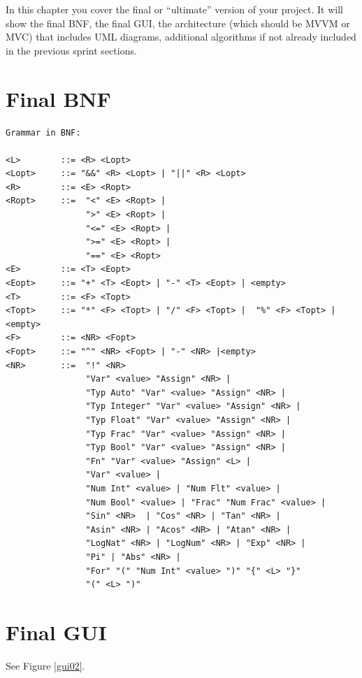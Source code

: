 \documentclass[a4paper, oneside, 11pt]{report}
\begin{document}
In this chapter you cover the final or ``ultimate'' version of your project. It will show the final BNF, the final GUI, the architecture (which should be MVVM or MVC) that includes UML diagrams, additional algorithms if not already included in the previous sprint sections.

\section{Final BNF}
\begin{verbatim}
Grammar in BNF:

<L>        ::= <R> <Lopt>
<Lopt>     ::= "&&" <R> <Lopt> | "||" <R> <Lopt> 
<R>        ::= <E> <Ropt>
<Ropt>     ::=  "<" <E> <Ropt> | 
                ">" <E> <Ropt> |  
                "<=" <E> <Ropt> | 
                ">=" <E> <Ropt> |
                "==" <E> <Ropt>
<E>        ::= <T> <Eopt>
<Eopt>     ::= "+" <T> <Eopt> | "-" <T> <Eopt> | <empty>
<T>        ::= <F> <Topt>
<Topt>     ::= "*" <F> <Topt> | "/" <F> <Topt> |  "%" <F> <Topt> |<empty>
<F>        ::= <NR> <Fopt>
<Fopt>     ::= "^" <NR> <Fopt> | "-" <NR> |<empty> 
<NR>       ::=  "!" <NR>
                "Var" <value> "Assign" <NR> |
                "Typ Auto" "Var" <value> "Assign" <NR> |
                "Typ Integer" "Var" <value> "Assign" <NR> |
                "Typ Float" "Var" <value> "Assign" <NR> |
                "Typ Frac" "Var" <value> "Assign" <NR> |
                "Typ Bool" "Var" <value> "Assign" <NR> |
                "Fn" "Var" <value> "Assign" <L> |
                "Var" <value> |
                "Num Int" <value> | "Num Flt" <value> |
                "Num Bool" <value> | "Frac" "Num Frac" <value> |
                "Sin" <NR>  | "Cos" <NR> | "Tan" <NR> |
                "Asin" <NR> | "Acos" <NR> | "Atan" <NR> |
                "LogNat" <NR> | "LogNum" <NR> | "Exp" <NR> |
                "Pi" | "Abs" <NR> |
                "For" "(" "Num Int" <value> ")" "{" <L> "}"
                "(" <L> ")"
\end{verbatim}
\section{Final GUI}

See Figure \ref{gui02}.
\end{document}
